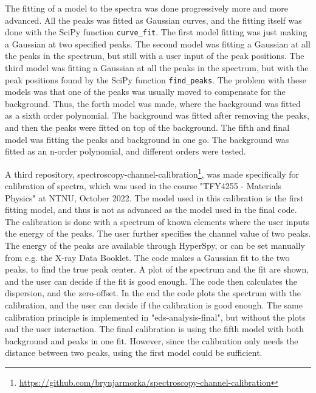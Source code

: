 The fitting of a model to the spectra was done progressively more and more advanced.
All the peaks was fitted as Gaussian curves, and the fitting itself was done with the SciPy function \verb|curve_fit|.
The first model fitting was just making a Gaussian at two specified peaks.
The second model was fitting a Gaussian at all the peaks in the spectrum, but still with a user input of the peak positions.
The third model was fitting a Gaussian at all the peaks in the spectrum, but with the peak positions found by the SciPy function \verb|find_peaks|.
The problem with these models was that one of the peaks was usually moved to compensate for the background.
Thus, the forth model was made, where the background was fitted as a sixth order polynomial.
The background was fitted after removing the peaks, and then the peaks were fitted on top of the background.
The fifth and final model was fitting the peaks and background in one go.
The background was fitted as an n-order polynomial, and different orders were tested.



A third repository, spectroscopy-channel-calibration\footnote{\url{https://github.com/brynjarmorka/spectroscopy-channel-calibration}}, was made specifically for calibration of spectra, which was used in the course "TFY4255 - Materials Physics" at NTNU, October 2022.
The model used in this calibration is the first fitting model, and thus is not as advanced as the model used in the final code.
The calibration is done with a spectrum of known elements where the user inputs the energy of the peaks.
The user further specifies the channel value of two peaks.
The energy of the peaks are available through HyperSpy, or can be set manually from e.g. the X-ray Data Booklet.
The code makes a Gaussian fit to the two peaks, to find the true peak center.
A plot of the spectrum and the fit are shown, and the user can decide if the fit is good enough.
The code then calculates the dispersion, and the zero-offset.
In the end the code plots the spectrum with the calibration, and the user can decide if the calibration is good enough.
The same calibration principle is implemented in "eds-analysis-final", but without the plots and the user interaction.
The final calibration is using the fifth model with both background and peaks in one fit.
However, since the calibration only needs the distance between two peaks, using the first model could be sufficient.



